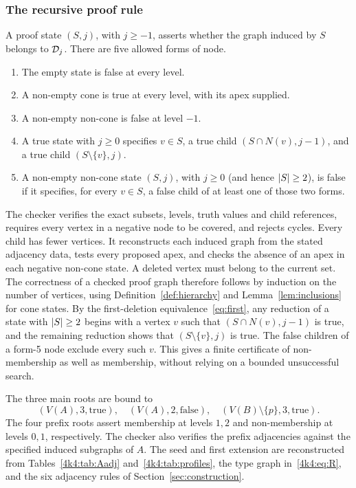\subsubsection{The recursive proof rule}
A proof state \((S,j)\), with \(j\geq-1\), asserts whether the
graph induced by \(S\) belongs to \(\mathcal D_j\).
There are five allowed forms of node.
\begin{enumerate}
\item The empty state is false at every level.
\item A non-empty cone is true at every level, with its apex supplied.
\item A non-empty non-cone is false at level \(-1\).
\item A true state with \(j\geq0\) specifies \(v\in S\), a true child
\((S\cap N(v),j-1)\), and a true child \((S\setminus\{v\},j)\).
\item A non-empty non-cone state \((S,j)\), with \(j\geq0\)
(and hence \(\lvert S\rvert\geq2\)), is false if it specifies, for every
\(v\in S\), a false child of at least one of those two forms.
\end{enumerate}
The checker verifies the exact subsets, levels, truth values and
child references, requires every vertex in a negative node to be
covered, and rejects cycles. Every child has fewer vertices.
It reconstructs each induced graph from the stated adjacency data,
tests every proposed apex, and checks the absence of an apex in each
negative non-cone state. A deleted vertex must belong to the current set.
The correctness of a checked proof graph therefore follows by
induction on the number of vertices, using Definition~\ref{def:hierarchy}
and Lemma~\ref{lem:inclusions} for cone states. By
the first-deletion equivalence~\eqref{eq:first}, any reduction of a state with
\(\lvert S\rvert\geq2\) begins with a vertex \(v\) such that
\((S\cap N(v),j-1)\) is true, and the remaining reduction shows
that \((S\setminus\{v\},j)\) is true. The false children of a
form-5 node exclude every such \(v\). This gives a finite certificate
of non-membership as well as membership, without relying on a bounded
unsuccessful search.

The three main roots are bound to
\[
(V(A),3,\mathrm{true}),\quad (V(A),2,\mathrm{false}),\quad
(V(B)\setminus\{p\},3,\mathrm{true}).
\]
The four prefix roots assert membership at levels \(1,2\) and
non-membership at levels \(0,1\), respectively.
The checker also verifies the prefix adjacencies against the
specified induced subgraphs of \(A\).
The seed and first extension are reconstructed from
Tables~\ref{4k4:tab:Aadj} and~\ref{4k4:tab:profiles}, the type graph
in~\eqref{4k4:eq:R}, and the six adjacency rules of
Section~\ref{sec:construction}.

